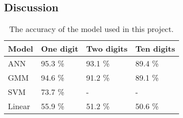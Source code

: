 \subsection*{Discussion}


\begin{table}[h]
\begin{tabular}{@{}l|lll@{}}
\toprule
Model 		   		   & One digit            & Two digits  & Ten digits   \\ \midrule
ANN                    & 95.3 \%                & 93.1 \%   & 89.4 \% \\
GMM                    & 94.6 \%                & 91.2 \%   & 89.1 \% \\
SVM                    & 73.7 \%                & - 	    & -       \\ 
Linear                 & 55.9 \% 				& 51.2 \%   & 50.6 \%
\end{tabular}
\caption{The accuracy of the model used in this project. }
\label{table:result}
\end{table}
